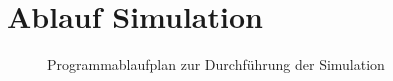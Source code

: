 \documentclass{scrartcl}
\begin{document}
\section{Ablauf Simulation}

\begin{figure}[H]
\centering
\def\svgwidth{350pt}

\caption{Programmablaufplan zur Durchführung der Simulation}
\label{fig:softwareablauf}
\end{figure}
\end{document}
